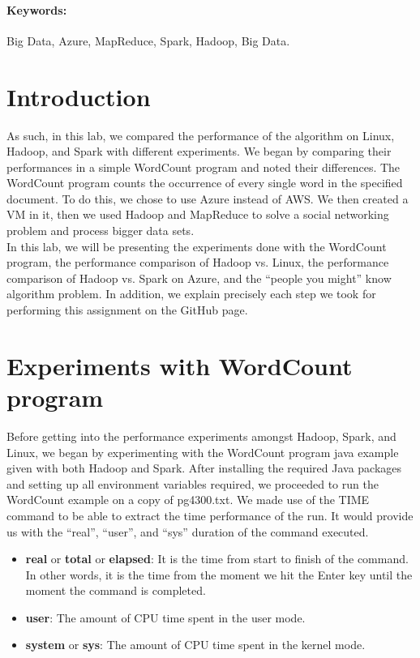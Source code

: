 \documentclass[12pt]{article}
\begin{document}
\paragraph{Keywords:}Big Data, Azure, MapReduce, Spark, Hadoop, Big Data.

\pagebreak

\section{Introduction} \label{sec:introduction}
\noindent As such, in this lab, we compared the performance of the algorithm on Linux, Hadoop, and Spark with different experiments. We began by comparing  their performances in a simple WordCount program and noted their differences. The WordCount program counts the occurrence of every single word in the specified document. To do this, we chose to use Azure instead of AWS. We then created a VM in it, then we used Hadoop and MapReduce to solve a social networking problem and process bigger data sets. \\
	
\noindent In this lab, we will be presenting the experiments done with the WordCount program, the performance comparison of Hadoop vs. Linux, the performance comparison of Hadoop vs. Spark on Azure, and the “people you might” know algorithm problem. In addition, we explain precisely each step we took for performing this assignment on the GitHub page.  

\bigskip

\pagebreak
	
\section{Experiments with WordCount program}

\noindent Before getting into the performance experiments amongst Hadoop, Spark, and Linux, we began by experimenting with the WordCount program java example given with both Hadoop and Spark. After installing the required Java packages and setting up all environment variables required, we proceeded to run the WordCount example on a copy of pg4300.txt. We made use of the TIME command to be able to extract the time performance of the run. It would provide us with the “real”, “user”, and “sys” duration of the command executed. 

\begin{itemize}
  \item \textbf{real} or \textbf{total} or \textbf{elapsed}: It is the time from start to finish of the command. In other words, it is the time from the moment we hit the Enter key until the moment  the command is completed.
    \item \textbf{user}: The amount of CPU time spent in the user mode.
    \item \textbf{system} or \textbf{sys}: The amount of CPU time spent in the kernel mode.
\end{itemize}
\end{document}
